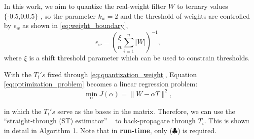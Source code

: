 \documentclass[twoside,twocolumn]{article}
\begin{document}
In this work, we aim to quantize the real-weight filter $W$ to ternary values $\text{\{-0.5,0,0.5\}}$ , so the parameter $k_w=2$ and the threshold of weights are controlled by $\epsilon_w$ as shown in \eqref{eq:weight_boundary},
\begin{equation}\label{eq:weight_boundary}
\epsilon _w=\left( \frac{\xi}{n}\sum_{i=1}^n{\left| W \right|} \right) ^{-1},
\end{equation}
where $\xi$ is a shift threshold parameter which can be used to constrain thresholds.

With the ${T_i}'s$ fixed through \eqref{eq:quantization_weight}, Equation \eqref{eq:optimization_problem} becomes a linear regression problem:
\begin{equation}\label{eq:linear_regression_problem}
\underset{\alpha}{\min}J\left( \alpha\right) =\lVert W-\alpha T \rVert ^2,
\end{equation}

\noindent in which the ${T_i}'s$ serve as the bases in the matrix. Therefore, we can use the ``straight-through (ST) estimator'' ~\cite{b43} to back-propagate through $T_i$. This is shown in detail in Algorithm 1. Note that in \textbf{run-time}, only ($\clubsuit$) is required.
\end{document}
